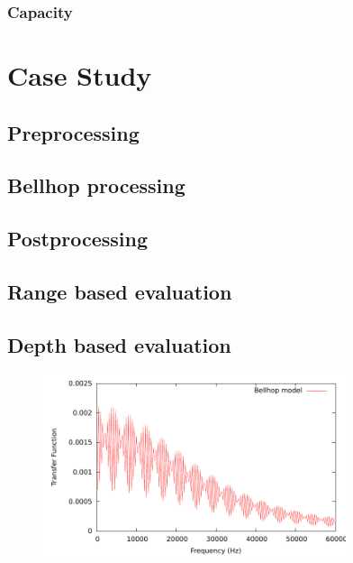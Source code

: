 \documentclass[a4paper]{IEEEtran}
\begin{document}
\subsubsection{Capacity}

\section{Case Study}
\label{sec:case}

\subsection{Preprocessing}

\subsection{Bellhop processing}

\subsection{Postprocessing}

\subsection{Range based evaluation}

\subsection{Depth based evaluation}
\begin{figure}
\centering
\includegraphics[width=3.5in]{../postprocessing/hreal00.pdf}
\end{figure}
\end{document}

